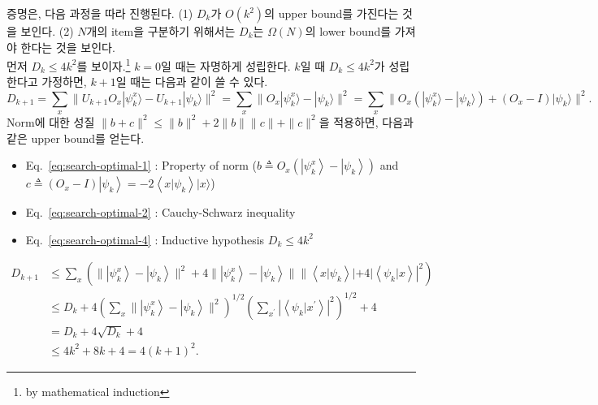 \vspace{1em}
증명은, 다음 과정을 따라 진행된다. (1) $D_k$가 $O(k^2)$의 upper bound를 가진다는 것을 보인다. (2) $N$개의 item을 구분하기 위해서는 $D_k$는 $\Omega(N)$의 lower bound를 가져야 한다는 것을 보인다. \\
먼저 $D_k \le 4k^2$를 보이자.\footnote{by mathematical induction} $k=0$일 때는 자명하게 성립한다. $k$일 때 $D_k \le 4k^2$가 성립한다고 가정하면, $k+1$일 때는 다음과 같이 쓸 수 있다.
\begin{equation*}
  D_{k+1} = \sum_x \| U_{k+1} O_x|\psi_k^x\rangle- U_{k+1}|\psi_k\rangle\|^2 = \sum_x \| O_x|\psi_k^x\rangle-|\psi_k\rangle\|^2 = \sum_x\| O_x(|\psi_k^x\rangle-|\psi_k\rangle)+(O_x-I)|\psi_k\rangle \|^2 .
\end{equation*}
Norm에 대한 성질 $\|b+c\|^2 \leq\|b\|^2+2\|b\|\|c\|+\|c\|^2$을 적용하면, 다음과 같은 upper bound를 얻는다.
\begin{itemize}
  \item Eq.~\eqref{eq:search-optimal-1} : Property of norm ($b \triangleq O_x\left(\left|\psi_k^x\right\rangle-\left|\psi_k\right\rangle\right)$ and $c \triangleq \left(O_x-I\right)\left|\psi_k\right\rangle=-2\left\langle x | \psi_k\right\rangle|x\rangle$)
  \item Eq.~\eqref{eq:search-optimal-2} : Cauchy-Schwarz inequality
  \item Eq.~\eqref{eq:search-optimal-4} : Inductive hypothesis $D_k \le 4k^2$
\end{itemize}
\begin{align}
  D_{k+1} & \leq \sum_x \left(\|\left|\psi_k^x\right\rangle-\left|\psi_k\right\rangle\|^2+4\|\left|\psi_k^x\right\rangle-\left.\left|\psi_k\right\rangle\| \|\left\langle x | \psi_k\right\rangle|+4|\left\langle\psi_k | x\right\rangle\right|^ 2\right) \label{eq:search-optimal-1} \\
  & \leq D_k+4\left(\sum_x \|\left|\psi_k^x\right\rangle-\left|\psi_k\right\rangle \|^2\right)^{1 / 2}\left(\sum_{x^{\prime}}\left|\left\langle\psi_k | x^{\prime}\right\rangle\right|^2\right)^{1 / 2}+4 \label{eq:search-optimal-2}\\
  & =D_k+4 \sqrt{D_k}+4 \label{eq:search-optimal-3} \\
  & \leq 4 k^2+8 k+4=4(k+1)^2. \label{eq:search-optimal-4}
\end{align}

